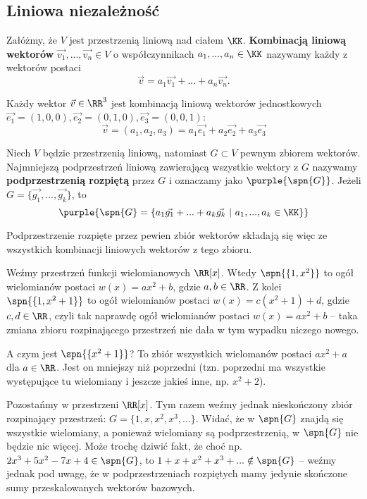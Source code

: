 \subsection{Liniowa niezależność}

Załóżmy, że $V$ jest przestrzenią liniową nad ciałem $\KK$. \textbf{Kombinacją liniową wektorów} $\vec{v_1}, ..., \vec{v_n} \in V$ o współczynnikach $a_1, ..., a_n \in \KK$ nazywamy każdy z wektorów postaci
$$\vec{v} = a_1\vec{v_1} + ... + a_n\vec{v_n}.$$

\begin{example}
    Każdy wektor $\vec{v} \in \RR^3$ jest kombinacją liniową wektorów jednostkowych $\vec{e_1} = (1, 0, 0), \vec{e_2} = (0, 1, 0), \vec{e_3} = (0, 0, 1)$:
    $$\vec{v} = (a_1, a_2, a_3) = a_1\vec{e_1} + a_2\vec{e_2} + a_3\vec{e_3}$$
\end{example}

Niech $V$ będzie przestrzenią liniową, natomiast $G \subset V$ pewnym zbiorem wektorów. Najmniejszą podprzestrzeń liniową zawierającą wszystkie wektory z $G$ nazywamy \textbf{podprzestrzenią rozpiętą} przez $G$ i oznaczamy jako
$\purple{\spn{G}}$. Jeżeli $G = \{\vec{g_1}, ..., \vec{g_k}\}$, to
$$\purple{\spn{G} = \{a_1\vec{g_1} + ... + a_k\vec{g_k} \ | \ a_1, ..., a_k \in \KK\}}$$

Podprzestrzenie rozpięte przez pewien zbiór wektorów składają się więc ze wszystkich kombinacji liniowych wektorów z tego zbioru.

\begin{example}
    Weźmy przestrzeń funkcji wielomianowych $\RR[x]$. Wtedy $\spn{\{1, x^2\}}$ to ogół wielomianów postaci $w(x) = ax^2 + b$, gdzie $a, b \in \RR$. Z kolei $\spn{\{1, x^2 + 1\}}$ to ogół wielomianów postaci $w(x) = c(x^2 + 1) + d$, gdzie $c, d \in \RR$, czyli tak naprawdę ogół wielomianów postaci $w(x) = ax^2 + b$ -- taka zmiana zbioru rozpinającego przestrzeń nie dała w tym wypadku niczego nowego.
    
    A czym jest $\spn{\{x^2 + 1\}}$? To zbiór wszystkich wielomanów postaci $ax^2 + a$ dla $a \in \RR$. Jest on mniejszy niż poprzedni (tzn. poprzedni ma wszystkie występujące tu wielomiany i jeszcze jakieś inne, np. $x^2 + 2$).
\end{example}

\begin{example}
	Pozostańmy w przestrzeni $\RR[x]$. Tym razem weźmy jednak nieskończony zbiór rozpinający przestrzeń: $G = \{1, x, x^2, x^3, ...\}$. Widać, że w $\spn{G}$ znajdą się wszystkie wielomiany, a ponieważ wielomiany są podprzestrzenią, w $\spn{G}$ nie będzie nic więcej. Może trochę dziwić fakt, że choć np. $2x^3 + 5x^2 - 7x + 4 \in \spn{G}$, to $1 + x + x^2 + x^3 + ... \notin \spn{G}$ -- weźmy jednak pod uwagę, że w podprzestrzeniach rozpiętych mamy jedynie skończone sumy przeskalowanych wektorów bazowych.
\end{example}

